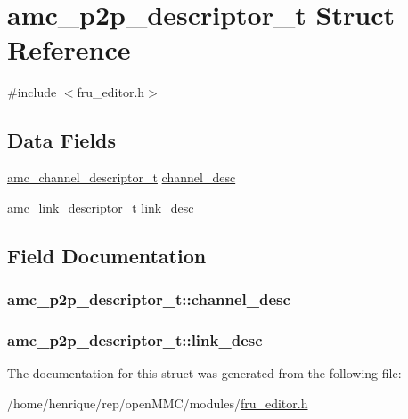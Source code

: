 \hypertarget{structamc__p2p__descriptor__t}{\section{amc\-\_\-p2p\-\_\-descriptor\-\_\-t Struct Reference}
\label{structamc__p2p__descriptor__t}
}


{\ttfamily \#include $<$fru\-\_\-editor.\-h$>$}

\subsection*{Data Fields}
\begin{DoxyCompactItemize}
\item 
\hyperlink{fru__editor_8h_a7b421734b1ca3f7f31decd7c43c65478}{amc\-\_\-channel\-\_\-descriptor\-\_\-t} \hyperlink{structamc__p2p__descriptor__t_a73fd21091d25d80471a36a86666d86e2}{channel\-\_\-desc}
\item 
\hyperlink{fru__editor_8h_a5618bb3b6f007bd1c21fd4986cd85917}{amc\-\_\-link\-\_\-descriptor\-\_\-t} \hyperlink{structamc__p2p__descriptor__t_aa38b641cd11604dbc121780e34b10eb4}{link\-\_\-desc}
\end{DoxyCompactItemize}


\subsection{Field Documentation}
\hypertarget{structamc__p2p__descriptor__t_a73fd21091d25d80471a36a86666d86e2}{
\subsubsection[{channel\-\_\-desc}]{ amc\-\_\-p2p\-\_\-descriptor\-\_\-t\-::channel\-\_\-desc}}\label{structamc__p2p__descriptor__t_a73fd21091d25d80471a36a86666d86e2}
\hypertarget{structamc__p2p__descriptor__t_aa38b641cd11604dbc121780e34b10eb4}{
\subsubsection[{link\-\_\-desc}]{ amc\-\_\-p2p\-\_\-descriptor\-\_\-t\-::link\-\_\-desc}}\label{structamc__p2p__descriptor__t_aa38b641cd11604dbc121780e34b10eb4}


The documentation for this struct was generated from the following file\-:\begin{DoxyCompactItemize}
\item 
/home/henrique/rep/open\-M\-M\-C/modules/\hyperlink{fru__editor_8h}{fru\-\_\-editor.\-h}\end{DoxyCompactItemize}
